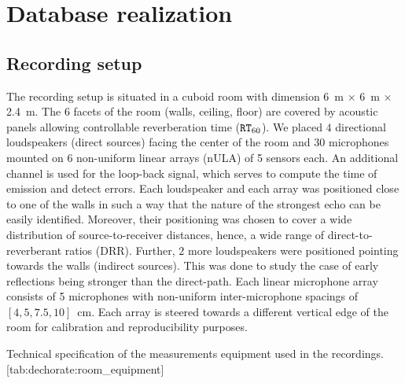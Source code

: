 \section{Database realization}
\subsection{Recording setup}
The recording setup is situated in a cuboid room with dimension 6~m $\times$ 6~m $\times$ 2.4~m.
The 6 facets of the room (walls, ceiling, floor) are covered by acoustic panels allowing controllable reverberation time ($\mathtt{RT}_{60}$).
We placed $4$ directional loudspeakers (direct sources) facing the center of the room and $30$ microphones mounted on 6 non-uniform linear arrays (nULA) of 5 sensors each.
An additional channel is used for the loop-back signal, which serves to compute the time of emission and detect errors.
Each loudspeaker and each array was positioned close to one of the walls in such a way that the nature of the strongest echo can be easily identified.
Moreover, their positioning was chosen to cover a wide distribution of source-to-receiver distances, hence, a wide range of direct-to-reverberant ratios (\ac{DRR}).
Further, $2$ more loudspeakers were positioned pointing towards the walls (indirect sources).
This was done to study the case of early reflections being stronger than the direct-path.
Each linear microphone array consists of 5 microphones with non-uniform inter-microphone spacings of $[4, 5, 7.5, 10]$~cm.
Each array is steered towards a different vertical edge of the room for calibration and reproducibility purposes.


\begin{table}[h]
    \begin{sidecaption}[]{
        Technical specification of the measurements equipment used in the recordings.
        }[tab:dechorate:room_equipment]
        \centering
        \small
        
    \end{sidecaption}
\end{table}

